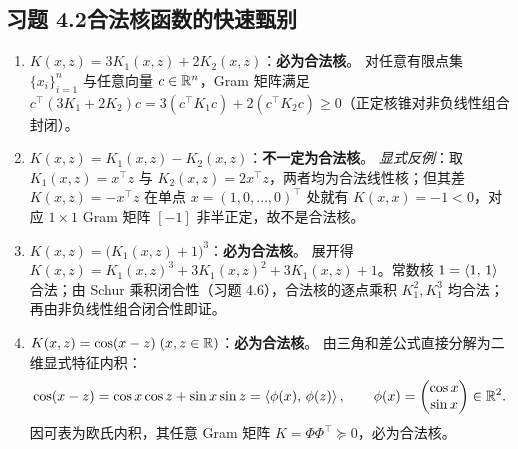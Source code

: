 \subsection*{习题 4.2\quad 合法核函数的快速甄别}
\begin{enumerate}[label=(\arabic*), leftmargin=1.8em]
  \item \textbf{$K(x, z) = 3 K_1(x, z) + 2 K_2(x, z)$}：\textbf{必为合法核}。
  对任意有限点集 $\{x_i\}_{i=1}^n$ 与任意向量 $c \in \mathbb{R}^n$，Gram 矩阵满足 $c^\top (3K_1 + 2K_2) c = 3(c^\top K_1 c) + 2(c^\top K_2 c) \ge 0$（正定核锥对非负线性组合封闭）。

  \item \textbf{$K(x, z) = K_1(x, z) - K_2(x, z)$}：\textbf{不一定为合法核}。
  \emph{显式反例}：取 $K_1(x, z) = x^\top z$ 与 $K_2(x, z) = 2 x^\top z$，两者均为合法线性核；但其差 $K(x, z) = -x^\top z$ 在单点 $x = (1, 0, \dots, 0)^\top$ 处就有 $K(x, x) = -1 < 0$，对应 $1\times 1$ Gram 矩阵 $[-1]$ 非半正定，故不是合法核。

  \item \textbf{$K(x, z) = \big(K_1(x, z) + 1\big)^3$}：\textbf{必为合法核}。
  展开得 $K(x, z) = K_1(x, z)^3 + 3 K_1(x, z)^2 + 3 K_1(x, z) + 1$。常数核 $1 = \left\langle 1,\, 1 \right\rangle$ 合法；由 Schur 乘积闭合性（习题 4.6），合法核的逐点乘积 $K_1^2, K_1^3$ 均合法；再由非负线性组合闭合性即证。

  \item \textbf{$K(x, z) = \cos(x - z)\;(x, z \in \mathbb{R})$}：\textbf{必为合法核}。
  由三角和差公式直接分解为二维显式特征内积：
  \[
    \cos(x - z) = \cos x \cos z + \sin x \sin z = \left\langle \phi(x),\, \phi(z) \right\rangle, \qquad
    \phi(x) = \begin{pmatrix} \cos x \\ \sin x \end{pmatrix} \in \mathbb{R}^2.
  \]
  因可表为欧氏内积，其任意 Gram 矩阵 $K = \Phi\Phi^\top \succeq 0$，必为合法核。
\end{enumerate}

